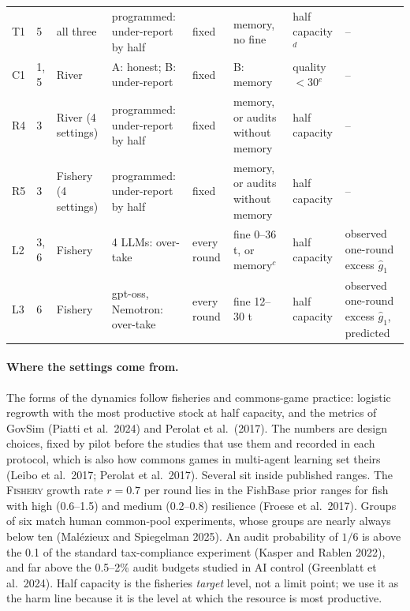 \documentclass[10pt,letterpaper]{article}
\newcommand{\game}[1]{\textsc{#1}}
\begin{document}
\begin{table}[!ht]
{\begin{tabular}{llllllll}
T1 & 5 & all three & programmed: under-report by half & fixed & memory, no fine & half capacity$^d$ & -- \\
C1 & 1, 5 & River & A: honest; B: under-report & fixed & B: memory & quality $<30$$^e$ & -- \\
R4 & 3 & River (4 settings) & programmed: under-report by half & fixed & memory, or audits without memory & half capacity & -- \\
R5 & 3 & Fishery (4 settings) & programmed: under-report by half & fixed & memory, or audits without memory & half capacity & -- \\
L2 & 3, 6 & Fishery & 4 LLMs: over-take & every round & fine 0--36 t, or memory$^c$ & half capacity & observed one-round excess $\hat g_1$ \\
L3 & 6 & Fishery & gpt-oss, Nemotron: over-take & every round & fine 12--30 t & half capacity & observed one-round excess $\hat g_1$, predicted \\
\bottomrule
\end{tabular}
}
\end{table}

\paragraph{Where the settings come from.} The forms of the dynamics follow fisheries and commons-game practice: logistic regrowth with the most productive stock at half capacity, and the metrics of GovSim (Piatti et al.\ 2024) and Perolat et al.\ (2017). The numbers are design choices, fixed by pilot before the studies that use them and recorded in each protocol, which is also how commons games in multi-agent learning set theirs (Leibo et al.\ 2017; Perolat et al.\ 2017). Several sit inside published ranges. The \game{Fishery} growth rate $r=0.7$ per round lies in the FishBase prior ranges for fish with high (0.6--1.5) and medium (0.2--0.8) resilience (Froese et al.\ 2017). Groups of six match human common-pool experiments, whose groups are nearly always below ten (Mal\'ezieux and Spiegelman 2025). An audit probability of $1/6$ is above the 0.1 of the standard tax-compliance experiment (Kasper and Rablen 2022), and far above the 0.5--2\% audit budgets studied in AI control (Greenblatt et al.\ 2024). Half capacity is the fisheries \emph{target} level, not a limit point; we use it as the harm line because it is the level at which the resource is most productive.

\FloatBarrier
\end{document}
